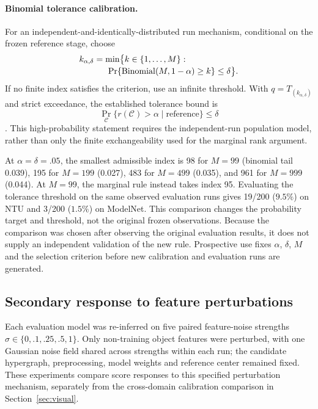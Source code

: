 \paragraph{Binomial tolerance calibration.}
For an independent-and-identically-distributed run mechanism,
conditional on the frozen reference stage, choose
\begin{equation}\label{eq:tolerance-order}
\begin{aligned}
k_{\alpha,\delta}
&=\min\bigl\{k\in\{1,\ldots,M\}:\\[-2pt]
&\hspace{1.5em}\Pr\{\operatorname{Binomial}(M,1-\alpha)\ge k\}
\le\delta\bigr\}.
\end{aligned}
\end{equation}
If no finite index satisfies the criterion, use an infinite threshold.
With $q=T_{(k_{\alpha,\delta})}$ and strict exceedance, the established
tolerance bound is
\[
\Pr_{\mathcal C}\{r(\mathcal C)>\alpha\mid\text{reference}\}
\le\delta
\]
\cite{vovk2012conditional}. This high-probability statement requires
the independent-run population model, rather than only the finite
exchangeability used for the marginal rank argument.

At $\alpha=\delta=.05$, the smallest admissible index is 98 for
$M=99$ (binomial tail 0.039), 195 for $M=199$ (0.027), 483 for
$M=499$ (0.035), and 961 for $M=999$ (0.044). At $M=99$, the marginal
rule instead takes index 95. Evaluating the tolerance threshold on
the same observed evaluation runs gives 19/200 ($9.5\%$) on NTU and
3/200 ($1.5\%$) on ModelNet. This comparison changes the probability
target and threshold, not the original frozen observations. Because
the comparison was chosen after observing the original evaluation
results, it does not supply an independent validation of the new
rule. Prospective use fixes $\alpha$, $\delta$, $M$ and the selection
criterion before new calibration and evaluation runs are generated.

\subsection{Secondary response to feature perturbations}\label{app:visual-response}
Each evaluation model was re-inferred on five paired feature-noise
strengths $\sigma\in\{0,.1,.25,.5,1\}$. Only non-training object
features were perturbed, with one Gaussian noise field shared across
strengths within each run; the candidate hypergraph, preprocessing,
model weights and reference center remained fixed. These experiments
compare score responses to this specified perturbation mechanism,
separately from the cross-domain calibration comparison in
Section~\ref{sec:visual}.

